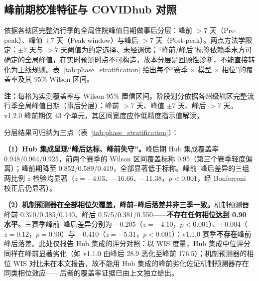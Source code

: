 \documentclass[10pt,UTF8,a4paper,zihao=-4]{ctexart}
\theoremstyle{plain}
\theoremstyle{remark}
\begin{document}
\subsection{峰前期校准特征与 COVIDhub 对照}\label{sec:phase_collapse}

依据各辖区完整流行季的全局住院峰值日期做事后分层：峰前 $>7$ 天（Pre-peak）、峰值 $\pm 7$ 天（Peak window）与峰后 $>7$ 天（Post-peak）。两点方法学限定：$\pm 7$ 天与 $>7$ 天阈值为约定选择、未经调优；“峰前/峰后”标签依赖季末方可确定的全局峰值，在实时预测时点不可构造，故本分层是回顾性诊断，不能直接转化为上线规则。表~\ref{tab:phase_stratification} 给出每个“赛季 $\times$ 模型 $\times$ 相位”的覆盖率及其 95\% Wilson 区间。

\begin{table}[htbp]
\centering
\footnotesize
\caption{CDC FluSight 按全局峰值相对位置分层的 95\% 区间实测覆盖率及 Wilson 置信区间（$h=1$ 周，严格四方交集）}
\label{tab:phase_stratification}
\setlength{\tabcolsep}{4pt}

\vspace{2pt}
\begin{flushleft}
\scriptsize \textbf{注：}每格为实测覆盖率与 Wilson 95\% 置信区间。阶段划分依据各州级辖区完整流行季全局峰值日期（事后分层）：峰前 $>7$ 天、峰值 $\pm 7$ 天、峰后 $>7$ 天。v1.2.0 峰前期仅 43 个单元，其区间宽度应作低精度指示值解读。
\end{flushleft}
\end{table}

分层结果可归纳为三点（表~\ref{tab:phase_stratification}）：

\textbf{（1）Hub 集成呈现“峰后达标、峰前失守”。}峰后期 Hub 集成覆盖率 0.948/0.964/0.925，前两个赛季的 Wilson 区间覆盖标称 0.95（第三个赛季轻度偏离）；峰前期降至 0.852/0.589/0.419，全部显著低于标称。峰前--峰后差异的三组两比例 $z$ 检验均显著（$z=-4.03$、$-16.66$、$-11.38$，$p<0.001$，经 Bonferroni 校正后仍显著）。

\textbf{（2）机制预测器在全部相位欠覆盖，峰前--峰后落差并非三季一致。}机制预测器峰前 0.370/0.385/0.140、峰后 0.575/0.381/0.550——\textbf{不存在任何相位达到 0.90 水平}。三赛季峰前--峰后差异分别为 $-0.205$（$z=-4.10$，$p<0.001$）、$+0.004$（$z=0.12$，$p=0.90$）与 $-0.410$（$z=-5.31$，$p<0.001$）：v1.1.0 赛季\textbf{不存在}峰前--峰后落差。此处仅报告 Hub 集成的评分对照：以 WIS 度量，Hub 集成中位评分同样在峰前显著劣化（如 v1.1.0 由峰后 28.9 恶化至峰前 176.5）；机制预测器的相位 WIS 对比未在本文报告，故不能用 Hub 集成的峰前劣化佐证机制预测器存在同类相位效应——后者的覆盖率证据已由上文独立给出。
\end{document}
